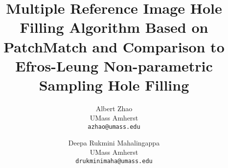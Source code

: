 \documentclass[10pt,twocolumn,letterpaper]{article}
\title{Multiple Reference Image Hole Filling Algorithm Based on PatchMatch and Comparison to Efros-Leung Non-parametric Sampling Hole Filling}
\author{Albert Zhao\\
UMass Amherst\\
{\tt\small azhao@umass.edu}
\and
Deepa Rukmini Mahalingappa\\
UMass Amherst\\
{\tt\small drukminimaha@umass.edu}
}
\begin{document}
\maketitle
    



{
    \small
    
    
}

% 
\end{document}
